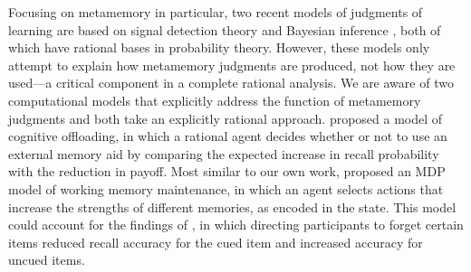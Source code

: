 


Focusing on metamemory in particular, two recent models of judgments of learning are based on signal detection theory \citep{jang2012stochastic} and Bayesian inference \citep{hu2021bayesian}, both of which have rational bases in probability theory. However, these models only attempt to explain how metamemory judgments are produced, not how they are used---a critical component in a complete rational analysis. We are aware of two computational models that explicitly address the function of metamemory judgments and both take an explicitly rational approach. \citet{hu2019role} proposed a model of cognitive offloading, in which a rational agent decides whether or not to use an external memory aid by comparing the expected increase in recall probability with the reduction in payoff. Most similar to our own work, \citet{suchow2016deciding} proposed an MDP model of working memory maintenance, in which an agent selects actions that increase the strengths of different memories, as encoded in the state. This model could account for the findings of \citet{williams2013benefit}, in which directing participants to forget certain items reduced recall accuracy for the cued item and increased accuracy for uncued items.

